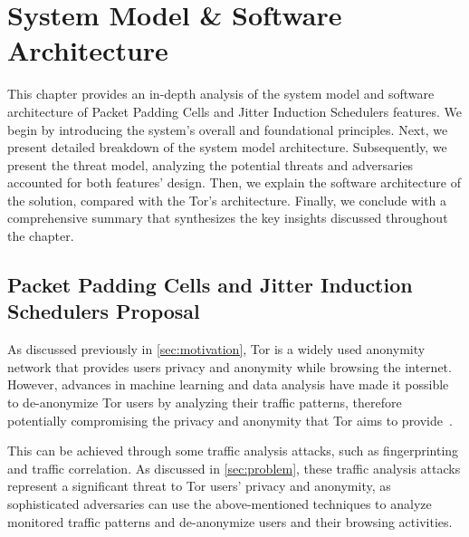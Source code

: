 
%

\makeatletter
\newcommand{\ntifpkgloaded}{%
  \@ifpackageloaded%
}
\makeatother


\chapter{System Model \& Software Architecture}\label{cha:system_model}

This chapter provides an in-depth analysis of the system model and software architecture of Packet Padding Cells and Jitter Induction Schedulers features. 
We begin by introducing the system's overall and foundational principles. 
Next, we present detailed breakdown of the system model architecture. 
Subsequently, we present the threat model, analyzing the potential threats and adversaries accounted for both features' design. 
Then, we explain the software architecture of the solution, compared with the Tor's architecture.
Finally, we conclude with a comprehensive summary that synthesizes the key insights discussed throughout the chapter.

\section{Packet Padding Cells and Jitter Induction Schedulers Proposal}\label{sec:system_propostal}

As discussed previously in \autoref{sec:motivation}, Tor is a widely used anonymity network that provides users privacy and anonymity while browsing the internet. However, advances in machine learning and data analysis have made it possible to de-anonymize Tor users by analyzing their traffic patterns, therefore potentially  compromising the privacy and anonymity that Tor aims to provide~\cite{chakravarty2014trafficanalysis, johnson2013users,winter2012great,robjansen2019dosontor}. 

This can be achieved through some traffic analysis attacks, such as fingerprinting and traffic correlation. As discussed in \autoref{sec:problem}, these traffic analysis attacks represent a significant threat to Tor users' privacy and anonymity, as sophisticated adversaries can use the above-mentioned techniques to analyze monitored traffic patterns and de-anonymize users and their browsing activities.

